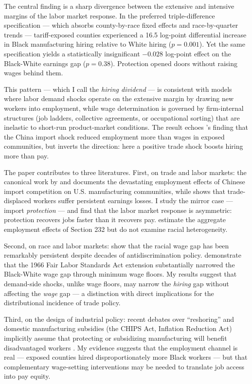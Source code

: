 \documentclass[12pt]{article}
\begin{document}
The central finding is a sharp divergence between the extensive and intensive margins of the labor market response. In the preferred triple-difference specification --- which absorbs county-by-race fixed effects and race-by-quarter trends --- tariff-exposed counties experienced a 16.5 log-point differential increase in Black manufacturing hiring relative to White hiring ($p = 0.001$). Yet the same specification yields a statistically insignificant $-0.028$ log-point effect on the Black-White earnings gap ($p = 0.38$). Protection opened doors without raising wages behind them.

This pattern --- which I call the \textit{hiring dividend} --- is consistent with models where labor demand shocks operate on the extensive margin by drawing new workers into employment, while wage determination is governed by firm-internal structures (job ladders, collective agreements, or occupational sorting) that are inelastic to short-run product-market conditions. The result echoes \citet{autor2013china}'s finding that the China import shock reduced employment more than wages in exposed communities, but inverts the direction: here a positive trade shock boosts hiring more than pay.

The paper contributes to three literatures. First, on trade and labor markets: the canonical work by \citet{autor2013china} and \citet{pierce2016surprisingly} documents the devastating employment effects of Chinese import competition on U.S. manufacturing communities, while \citet{dix2017trade} shows that trade-displaced workers suffer persistent earnings losses. I study the mirror case --- import \textit{protection} --- and find that the labor market response is asymmetric: protection recovers jobs faster than it recovers pay. \citet{flaaen2020effect} estimate the aggregate employment effects of Section 232 but do not examine racial heterogeneity.

Second, on race and labor markets: \citet{charles2008prejudice} show that the racial wage gap has been remarkably persistent despite decades of antidiscrimination policy. \citet{derenoncourt2022minimum} demonstrate that the 1966 Fair Labor Standards Act extension substantially narrowed the Black-White wage gap through minimum wage floors. My results suggest that demand-side shocks, unlike wage floors, may narrow the \textit{hiring} gap without affecting the \textit{wage} gap --- a distinction with direct implications for the distributional incidence of trade policy.

Third, on the design of industrial policy: recent debates over ``reshoring'' and domestic manufacturing subsidies (the CHIPS Act, Inflation Reduction Act) implicitly assume that protecting or subsidizing manufacturing will benefit disadvantaged workers \citep{autor2021work}. My evidence suggests that the employment channel is real --- exposed counties hired disproportionately more Black workers --- but that complementary wage-setting interventions may be needed to translate job access into pay equity.
\end{document}
